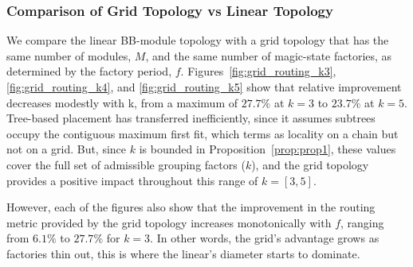 \documentclass[sigconf]{acmart}
\begin{document}
%
\subsubsection{Comparison of Grid Topology vs Linear Topology}
We compare the linear BB-module topology with a grid topology that has the same number of modules, $M$, and the same number of magic-state factories, as determined by the factory period, $f$. Figures~\ref{fig:grid_routing_k3}, \ref{fig:grid_routing_k4}, and \ref{fig:grid_routing_k5} show that relative improvement decreases modestly with k, from a maximum of $27.7\%$ at $k=3$ to $23.7\%$ at $k=5$. Tree-based placement has transferred inefficiently, since it assumes subtrees occupy the contiguous maximum first fit, which terms as locality on a chain but not on a grid. But, since $k$ is bounded in Proposition~\ref {prop:prop1}, these values cover the full set of admissible grouping factors ($k$), and the grid topology provides a positive impact throughout this range of $k = [3,5]$.

However, each of the figures also show that the improvement in the routing metric provided by the grid topology increases monotonically with $f$, ranging from $6.1\%$ to $27.7\%$ for $k=3$. In other words, the grid's advantage grows as factories thin out, this is where the linear's diameter starts to dominate. 
 
%
\end{document}
